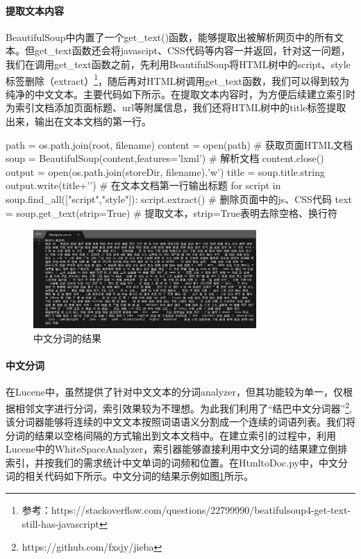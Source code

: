 \documentclass{article}
\begin{document}
\paragraph{提取文本内容}
BeautifulSoup中内置了一个get\_text()函数，能够提取出被解析网页中的所有文本。但get\_text函数还会将javascipt、CSS代码等内容一并返回，针对这一问题，我们在调用get\_text函数之前，先利用BeautifulSoup将HTML树中的script、style标签删除（extract）\footnote{参考：https://stackoverflow.com/questions/22799990/beatifulsoup4-get-text-still-has-javascript}，随后再对HTML树调用get\_text函数，我们可以得到较为纯净的中文文本。主要代码如下所示。在提取文本内容时，为方便后续建立索引时为索引文档添加页面标题、url等附属信息，我们还将HTML树中的title标签提取出来，输出在文本文档的第一行。

\begin{python}
path = os.path.join(root, filename)
content = open(path)                                # 获取页面HTML文档
soup = BeautifulSoup(content,features='lxml')       # 解析文档
content.close()
output = open(os.path.join(storeDir, filename),'w')
title = soup.title.string
output.write(title+'\n')                            # 在文本文档第一行输出标题
for script in soup.find_all(["script","style"]):
    script.extract()                                # 删除页面中的js、CSS代码      
text = soup.get_text(strip=True)                    # 提取文本，strip=True表明去除空格、换行符
\end{python}

\begin{figure}[htbp]
\centering
\includegraphics[width=8.5cm]{img/jiebadoc.png}
\caption{中文分词的结果}
\label{fig:jiebadoc}
\end{figure}


\paragraph{中文分词}
在Lucene中，虽然提供了针对中文文本的分词analyzer，但其功能较为单一，仅根据相邻文字进行分词，索引效果较为不理想。为此我们利用了“结巴中文分词器”\footnote{https://github.com/fxsjy/jieba},该分词器能够将连续的中文文本按照词语语义分割成一个连续的词语列表。我们将分词的结果以空格间隔的方式输出到文本文档中。在建立索引的过程中，利用Lucene中的WhiteSpaceAnalyzer，索引器能够直接利用中文分词的结果建立倒排索引，并按我们的需求统计中文单词的词频和位置。在HtmltoDoc.py中，中文分词的相关代码如下所示。中文分词的结果示例如图\ref{fig:jiebadoc}所示。
\end{document}
